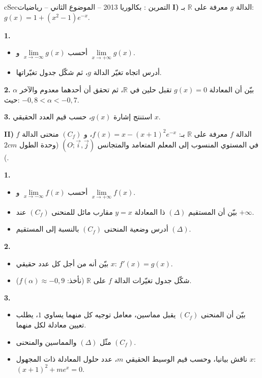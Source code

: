 \documentclass[12pt,a4paper]{article}
\newenvironment{BOX}[2]{\begin{otherlanguage}{english}\begin{arbox}{#1}{#2}}{\end{arbox}\end{otherlanguage}}
\newcounter{exo}
\newenvironment{tamrin}[1]{\stepcounter{exo}\begin{BOX}{cSec}{التمرين \theexo: #1}}{\end{BOX}}
\newcommand{\R}{\mathbb{R}}
\newenvironment{sq}{\begin{itemize}[leftmargin=2.4em,itemsep=3pt]}{\end{itemize}}
\newcommand{\qa}{\item[(أ)]}\newcommand{\qb}{\item[(ب)]}\newcommand{\qc}{\item[(جـ)]}\newcommand{\qd}{\item[(د)]}\newcommand{\qe}{\item[(هـ)]}
\newcommand{\QQ}[1]{\par\smallskip\textbf{#1.} }
\begin{document}
\begin{tamrin}{بكالوريا 2013 -- الموضوع الثاني -- رياضيات}
\textbf{I)} الدالة $g$ معرفة على $\R$ بـ: $g(x)=1+(x^2-1)e^{-x}$.
\QQ{1}
\begin{sq}
\qa أحسب $\lim\limits_{x\to-\infty}g(x)$ و $\lim\limits_{x\to+\infty}g(x)$.
\qb أدرس اتجاه تغيّر الدالة $g$، ثم شكّل جدول تغيّراتها.
\end{sq}
\QQ{2} بيّن أن المعادلة $g(x)=0$ تقبل حلين في $\R$، ثم تحقق أن أحدهما معدوم والآخر $\alpha$ حيث: $-0{,}8<\alpha<-0{,}7$.
\QQ{3} استنتج إشارة $g(x)$، حسب قيم العدد الحقيقي $x$.

\textbf{II)} الدالة $f$ معرفة على $\R$ بـ: $f(x)=x-(x+1)^2e^{-x}$،
و $(C_f)$ منحنى الدالة $f$ في المستوي المنسوب إلى المعلم المتعامد والمتجانس $(O;\vec i,\vec j)$ (وحدة الطول $2cm$).
\QQ{1}
\begin{sq}
\qa أحسب $\lim\limits_{x\to-\infty}f(x)$ و $\lim\limits_{x\to+\infty}f(x)$.
\qb بيّن أن المستقيم $(\Delta)$ ذا المعادلة $y=x$ مقارب مائل للمنحنى $(C_f)$ عند $+\infty$.
\qc أدرس وضعية المنحنى $(C_f)$ بالنسبة إلى المستقيم $(\Delta)$.
\end{sq}
\QQ{2}
\begin{sq}
\qa بيّن أنه من أجل كل عدد حقيقي $x$: $f'(x)=g(x)$.
\qb شكّل جدول تغيّرات الدالة $f$ على $\R$ (نأخذ: $f(\alpha)\approx-0{,}9$).
\end{sq}
\QQ{3}
\begin{sq}
\qa بيّن أن المنحنى $(C_f)$ يقبل مماسين، معامل توجيه كل منهما يساوي $1$، يطلب تعيين معادلة لكل منهما.
\qb مثّل $(\Delta)$ والمماسين والمنحنى $(C_f)$.
\qc ناقش بيانيا، وحسب قيم الوسيط الحقيقي $m$، عدد حلول المعادلة ذات المجهول $x$: $(x+1)^2+me^{x}=0$.
\end{sq}
\end{tamrin}
\end{document}
